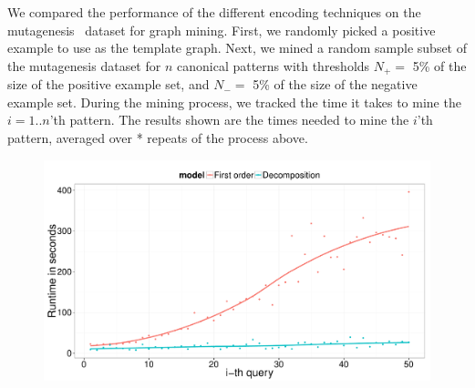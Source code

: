 %
%
%
%
%
%
%
%
We compared the performance of the different encoding techniques on the mutagenesis~\citep{?} dataset for graph mining.
First, we randomly picked a positive example to use as the template graph.
Next, we mined a random sample subset of the mutagenesis dataset for $n$ canonical patterns with thresholds $N_{+} = $ 5\% of the size of the positive example set, and $N_{-} =$ 5\% of the size of the negative example set.
During the mining process, we tracked the time it takes to mine the $i=1..n$'th pattern.
The results shown are the times needed to mine the $i$'th pattern, averaged over * repeats of the process above.

\begin{figure}
\includegraphics[scale=0.20]{extra/figure_comparison_yoshida.pdf}
\end{figure}
